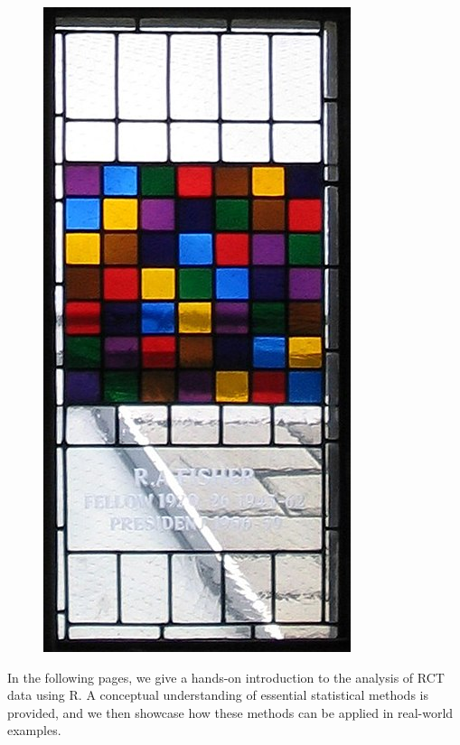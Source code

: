 \begin{figure}
\vspace{-15pt}
\includegraphics[width=0.8\linewidth,right]{images/latin_square.jpg}
\vspace{-10pt}
\label{fig:wrapfig}
\end{figure}

\footnotesize
In the following pages, we give a hands-on introduction to the analysis of RCT data using \textsf{R}. A conceptual understanding of essential statistical methods is provided, and we then showcase how these methods can be applied in real-world examples. 

